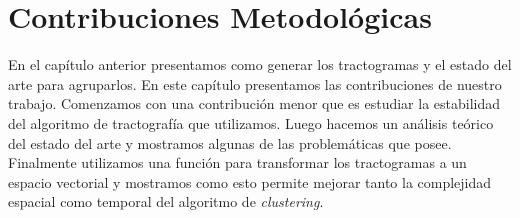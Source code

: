 \chapter{Contribuciones Metodol\'ogicas}
\label{ch:contribuciones}

En el cap\'itulo anterior presentamos como generar los tractogramas y el 
estado del arte para agruparlos. En este cap\'itulo presentamos las
contribuciones de nuestro trabajo. Comenzamos con una contribuci\'on menor
que es estudiar la estabilidad del algoritmo de tractograf\'ia que
utilizamos. Luego hacemos un an\'alisis te\'orico del estado del arte y
mostramos algunas de las problem\'aticas que posee. Finalmente utilizamos
una funci\'on para transformar los tractogramas a un espacio vectorial y
mostramos como esto permite mejorar tanto la complejidad espacial como
temporal del algoritmo de \textit{clustering}. \\















